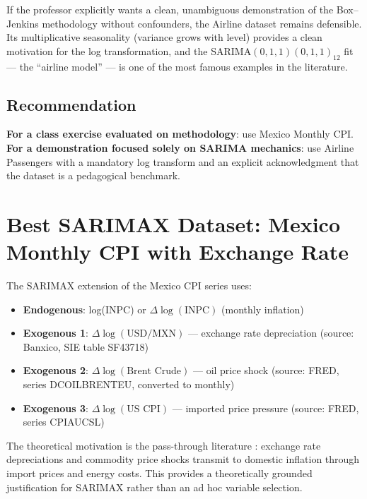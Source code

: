 \documentclass[12pt,a4paper]{article}
\begin{document}
If the professor explicitly wants a clean, unambiguous demonstration of the
Box--Jenkins methodology without confounders, the Airline dataset remains
defensible. Its multiplicative seasonality (variance grows with level) provides a
clean motivation for the log transformation, and the SARIMA$(0,1,1)(0,1,1)_{12}$
fit — the ``airline model'' — is one of the most famous examples in the literature.

\subsection{Recommendation}

\textbf{For a class exercise evaluated on methodology}: use Mexico Monthly CPI.
\textbf{For a demonstration focused solely on SARIMA mechanics}: use Airline Passengers with a mandatory log transform and an explicit acknowledgment that the dataset is a pedagogical benchmark.

\section{Best SARIMAX Dataset: Mexico Monthly CPI with Exchange Rate}

The SARIMAX extension of the Mexico CPI series uses:

\begin{itemize}[noitemsep]
  \item \textbf{Endogenous}: log(INPC) or $\Delta\log(\text{INPC})$ (monthly inflation)
  \item \textbf{Exogenous 1}: $\Delta\log(\text{USD/MXN})$ — exchange rate depreciation
  (source: Banxico, SIE table SF43718)
  \item \textbf{Exogenous 2}: $\Delta\log(\text{Brent Crude})$ — oil price shock
  (source: FRED, series DCOILBRENTEU, converted to monthly)
  \item \textbf{Exogenous 3}: $\Delta\log(\text{US CPI})$ — imported price pressure
  (source: FRED, series CPIAUCSL)
\end{itemize}

The theoretical motivation is the pass-through literature \citep{Burstein2010}:
exchange rate depreciations and commodity price shocks transmit to domestic
inflation through import prices and energy costs. This provides a theoretically
grounded justification for SARIMAX rather than an ad hoc variable selection.
\end{document}
